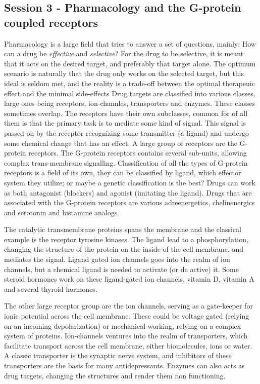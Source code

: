 \documentclass[12p]{article}
\begin{document}
\subsection*{Session 3 - Pharmacology and the G-protein coupled receptors}

Pharmacology is a large field that tries to answer a set of questions, mainly: How can a drug be \emph{effective} and \emph{selective}?
For the drug to be selective, it is meant that it acts on the desired target, and preferably that target alone.
The optimum scenario is naturally that the drug only works on the selected target, but this ideal is seldom met, and the reality is a trade-off between the optimal therapeuic effect and the minimal side-effects
Drug targets are classified into various classes, large ones being receptors, ion-channles, transporters and enzymes. 
These classes sometimes overlap.
The receptors have their own subclasses, common for of all them is that the primary task is to mediate some kind of signal.
This signal is passed on by the receptor recognizing some transmitter (a ligand) and undergo some chemical change that has an effect.
A large group of receptors are the G-protein receptors.
The G-protein receptors contains several sub-units, allowing complex trans-membrane signalling.
Classification of all the types of G-protein receptors is a field of its own, they can be classified by ligand, which effector system they utilize; or maybe a genetic classification is the best?
Drugs can work as both antagonist (blockers) and agonist (imitating the ligand).
Drugs that are associated with the G-protein receptors are various adreenergetics, chelinenergics and serotonin and histamine analogs.

The catalytic transmembrane proteins spans the membrane and the classical example is the receptor tyrosine kinases.
The ligand lead to a phosphorylation, changing the structure of the protein on the inside of the cell membrane, and mediates the signal.
Ligand gated ion channels goes into the realm of ion channels, but a chemical ligand is needed to activate (or de active) it.
Some steroid hormones work on these ligand-gated ion channels, vitamin D, vitamin A and several thyroid hormones.

The other large receptor group are the ion channels, serving as a gate-keeper for ionic potential  across the cell membrane.
These could be voltage gated (relying on an incoming depolarization) or mechanical-working, relying on a complex system of proteins.
Ion-channels ventures into the realm of transporters, which facilitate transport across the cell membrane, either biomolecules, ions or water.
A classic transporter is the synaptic nerve system, and inhibitors of these transporters are the basis for many antidepressants.
Enzymes can also acts as drug targets, changing the structures and render them non functioning.
\end{document}
